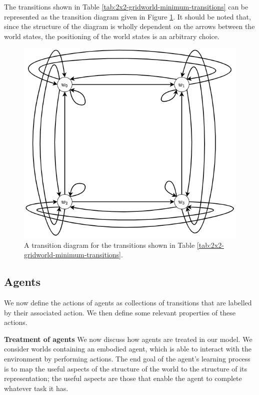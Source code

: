 The transitions shown in Table \ref{tab:2x2-gridworld-minimum-transitions} can be represented as the transition diagram given in Figure \ref{fig:2x2-cyclical-min-trans}.
It should be noted that, since the structure of the diagram is wholly dependent on the arrows between the world states, the positioning of the world states is an arbitrary choice.

\begin{figure}
    \centering
    \includegraphics[width=0.5\linewidth]{2MathematicalFramework/InitialFramework/Images/2x2-cyclical-min-trans.drawio.png}
    \caption{A transition diagram for the transitions shown in Table \ref{tab:2x2-gridworld-minimum-transitions}.}
    \label{fig:2x2-cyclical-min-trans}
\end{figure}

\subsection{Agents}
We now define the actions of agents as collections of transitions that are labelled by their associated action.
We then define some relevant properties of these actions.

\textbf{Treatment of agents}
We now discuss how agents are treated in our model.
We consider worlds containing an embodied agent, which is able to interact with the environment by performing actions.
The end goal of the agent's learning process is to map the useful aspects of the structure of the world to the structure of its representation; the useful aspects are those that enable the agent to complete whatever task it has.

